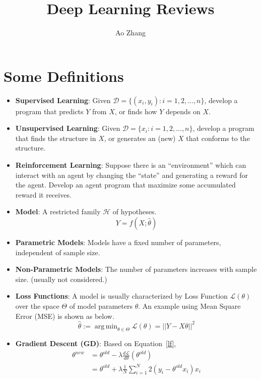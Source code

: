 \documentclass[a4paper]{article}
\title{Deep Learning Reviews}
\author{Ao Zhang}
\DeclareMathOperator*{\argmin}{arg\,min}
\begin{document}
\maketitle


\section{Some Definitions}

\begin{itemize}
	\item \textbf{Supervised Learning}: Given $\mathcal{D} = \{ (x_i, y_i): i = 1, 2, ..., n \}$, develop a program that predicts $Y$ from $X$, or finds how $Y$ depends on $X$.
	\item \textbf{Unsupervised Learning}: Given $\mathcal{D} = \{ x_i: i = 1, 2, ..., n \}$, develop a program that finds the structure in $X$, or generates an (new) $X$ that conforms to the structure.
	\item \textbf{Reinforcement Learning}: Suppose there is an ``environment'' which can interact with an agent by changing the ``state'' and generating a reward for the agent. Develop an agent program that maximize some accumulated reward it receives.
	\item \textbf{Model}: A restricted family $\mathcal{H}$ of hypotheses. 
	\begin{equation}
		Y = f(X; \hat{\theta})
	\end{equation}
	\item \textbf{Parametric Models}: Models have a fixed number of parameters, independent of sample size.
	\item \textbf{Non-Parametric Models}: The number of parameters increases with sample size. (usually not considered.)
	\item \textbf{Loss Functions}: A model is usually characterized by Loss Function $\mathcal{L}(\theta)$ over the space $\Theta$ of model parameters $\theta$. An example using Mean Square Error (MSE) is shown as below.
	\begin{equation}
		\hat{\theta} := \argmin_{\theta \in \Theta} \mathcal{L}(\theta) = || Y - X \theta ||^2 \label{lf}
	\end{equation}
	\item \textbf{Gradient Descent (GD)}: Based on Equation~\ref{lf},
	\begin{align}
		{\theta}^{new} &= {\theta}^{old} - \lambda \frac{d \mathcal{L}}{d \theta} ({\theta}^{old}) \\
		&= {\theta}^{old} + \lambda \frac{1}{N} \sum_{i=1}^{N} 2 (y_i - {\theta}^{old} x_i) x_i

\end{align}
\end{itemize}
\end{document}
